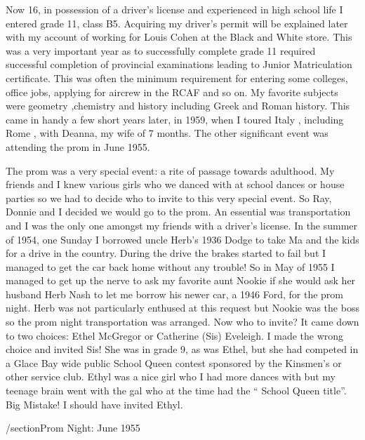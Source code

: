 Now 16, in possession of a driver's license and experienced in high school life I entered grade 11, class B5. Acquiring my driver's permit will be explained later with my account of working for Louis Cohen at the Black and White store. This was a very important year as to successfully complete grade 11 required successful completion of provincial examinations leading to Junior Matriculation certificate. This was often the minimum requirement for entering some colleges, office jobs, applying for aircrew in the RCAF and so on. My favorite subjects were geometry ,chemistry and history including Greek and Roman history. This came in handy a few short years later, in 1959, when I toured Italy , including Rome , with Deanna, my wife of 7 months. The other significant event was attending the prom in June 1955.

The prom was a very special event: a rite of passage towards adulthood. My friends and I knew various girls who we danced with at school dances or house parties so we had to decide who to invite to this very special event. So Ray, Donnie and I decided we would go to the prom. An essential was transportation and I was the only one amongst my friends with a driver's license. In the summer of 1954, one Sunday I borrowed uncle Herb's 1936 Dodge to take Ma and the kids for a drive in the country. During the drive the brakes started to fail but I managed to get the car back home without any trouble! So in May of 1955 I managed to get up the nerve to ask my favorite aunt Nookie if she would ask her husband Herb Nash to let me borrow his newer car, a 1946 Ford, for the prom night. Herb was not particularly enthused at this request but Nookie was the boss so the prom night transportation was arranged. 
Now who to invite? It came down to two choices: Ethel McGregor or Catherine (Sis) Eveleigh. I made the wrong choice and invited Sis! She was in grade 9, as was Ethel, but she had competed in a Glace Bay wide public School Queen contest sponsored by the Kinsmen's or other service club. Ethyl was a nice girl who I had more dances with but my teenage brain went with the gal who at the time had the “ School Queen title”. Big Mistake! I should have invited Ethyl.

/section{Prom Night: June 1955}

